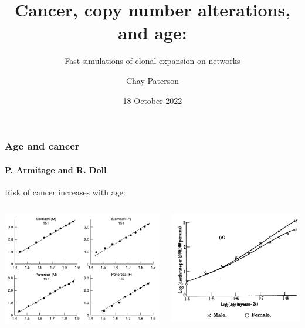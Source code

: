 \documentclass{beamer}
\title{Cancer, copy number alterations, and age:}
\subtitle{Fast simulations of clonal expansion on networks}
\author{Chay Paterson}
\institute{University of Manchester}
\date{18 October 2022}
\begin{document}

\frame{\titlepage}

\begin{frame}
    \frametitle{Age and cancer}
    \framesubtitle{P. Armitage and R. Doll\footnotemark[12]}

    \begin{center}
    Risk of cancer increases with age:
    \end{center}

    \begin{columns}
        \begin{column}{0.5\textwidth}
        \includegraphics[width=\textwidth]{figures/PArmitageRDoll_1954_6602297.pdf}
        \end{column}
        \begin{column}{0.5\textwidth}
        \includegraphics[width=\textwidth]{figures/ArmitageDoll1957_4A.png}
        \end{column}
    \end{columns}



\end{frame}
\end{document}
